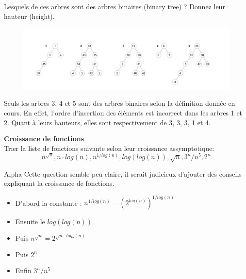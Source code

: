 \begin{Exercice}
	Lesquels de ces arbres sont des arbres binaires (binary tree) ? Donnez leur hauteur (height).
	\begin{figure}[h!]
        		\centering
       	 	\includegraphics[width=18cm]{resources/exercice5.png}
    	\end{figure}
	\begin{solution}
		Seuls les arbres 3, 4 et 5 sont des arbres binaires selon la définition donnée en cours. En effet, l'ordre d'insertion des éléments est incorrect dans les arbres 1 et 2. 
		Quant à leurs hauteurs, elles sont respectivement de 3, 3, 3, 1 et 4.
	\end{solution}
\end{Exercice}


\begin{Exercice}[10 minutes]\textbf{Croissance de fonctions}\\
	Trier la liste de fonctions suivante selon leur croissance assymptotique:
	\begin{equation}
		n^{\sqrt{n}}, n\cdot log(n), n^{1/log(n)}, log(log(n)), \sqrt{n}, 3^{n}/{n^5}, 2^n
	\end{equation}

	\begin{note}{Alpha}
		Cette question semble peu claire, il serait judicieux d'ajouter des conseils expliquant la croissance de fonctions.
	\end{note}
	
	\begin{solution}
		\begin{itemize}
			\item D'abord la constante : $n^{1/log(n)} = (2^{log(n)})^{1/log(n)}$
			\item Ensuite le $log(log(n))$
			\item Puis $n^{\sqrt{n}} = 2^{\sqrt{n}\cdot log_2(n)}$
			\item Puis $2^n$
			\item Enfin  $3^{n}/{n^5}$
		\end{itemize}
	\end{solution}
\end{Exercice}


